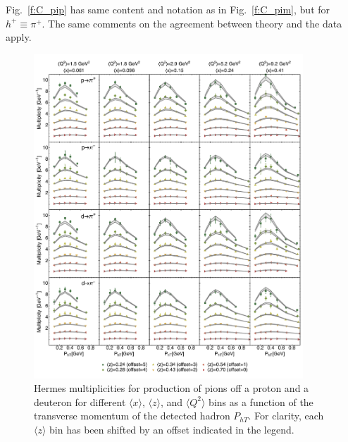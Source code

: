 \documentclass[aps,preprintnumbers,showpacs,nofootinbib,superscriptaddress,floatfix]{revtex4}
\begin{document}
Fig.~\ref{f:C_pip} has same content and notation as in Fig.~\ref{f:C_pim}, but
for $h^+ \equiv \pi^+$. The same comments on the agreement between theory and
the data apply. 
\begin{figure}[h!]
\begin{center}
\includegraphics[width=0.90\textwidth]{plots/Hermes_Pions_SCIplot_flINDEP.pdf}
\end{center}
\caption{Hermes multiplicities for production of pions off a proton and a deuteron for different $\langle x \rangle$, $\langle z \rangle$, and $\langle Q^2 \rangle$ bins as a function of the transverse momentum of the detected hadron  $P_{hT}$. For clarity, each $\langle z \rangle$  bin has been shifted by an offset indicated in the legend.} 
\label{f:H_pions}
\end{figure}
\end{document}
